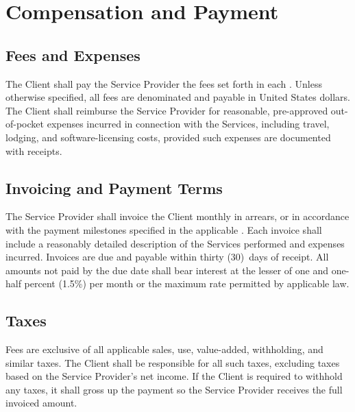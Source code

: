 \section{Compensation and Payment}

\subsection{Fees and Expenses}
The Client shall pay the Service Provider the fees set forth in each . Unless otherwise specified, all fees are denominated and payable in United States dollars. The Client shall reimburse the Service Provider for reasonable, pre-approved out-of-pocket expenses incurred in connection with the Services, including travel, lodging, and software-licensing costs, provided such expenses are documented with receipts.

\subsection{Invoicing and Payment Terms}
The Service Provider shall invoice the Client monthly in arrears, or in accordance with the payment milestones specified in the applicable . Each invoice shall include a reasonably detailed description of the Services performed and expenses incurred. Invoices are due and payable within thirty (30)~days of receipt. All amounts not paid by the due date shall bear interest at the lesser of one and one-half percent (1.5\%) per month or the maximum rate permitted by applicable law.

\subsection{Taxes}
Fees are exclusive of all applicable sales, use, value-added, withholding, and similar taxes. The Client shall be responsible for all such taxes, excluding taxes based on the Service Provider's net income. If the Client is required to withhold any taxes, it shall gross up the payment so the Service Provider receives the full invoiced amount.

